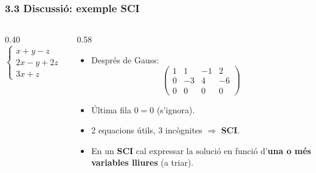 \documentclass[aspectratio=169]{beamer}
\newcommand{\textverd}[1]{{\color{margueVerdFosc}#1}}
\begin{document}
\begin{frame}[t]
  \frametitle{3.3 Discussió: exemple SCI}

  \vspace{-0.3cm}
  \begin{columns}[T,onlytextwidth]
    \begin{column}{0.40\textwidth}
      \[
        \left\{\begin{aligned}
          x + y - z &= 2 \\
          2x - y + 2z &= -2 \\
          3x + z &= 0
        \end{aligned}\right.
      \]
    \end{column}
    \begin{column}{0.58\textwidth}
      \begin{itemize}
        \item<1-> Després de Gauss:
          \[
            \left(\begin{array}{ccc|c}
              1 & 1 & -1 & 2 \\
              0 & -3 & 4 & -6 \\
              0 & 0 & 0 & 0
            \end{array}\right)
          \]
        \item<2-> Última fila $0=0$ (s'ignora).
        \item<3-> 2 equacions útils, 3 incògnites \;$\Rightarrow$\; \textverd{\textbf{SCI}}.
        \item<4-> En un \textbf{SCI} cal expressar la solució en funció
          d'\textbf{una o més variables lliures} (a triar).
      \end{itemize}
    \end{column}
  \end{columns}
\end{frame}
\end{document}
